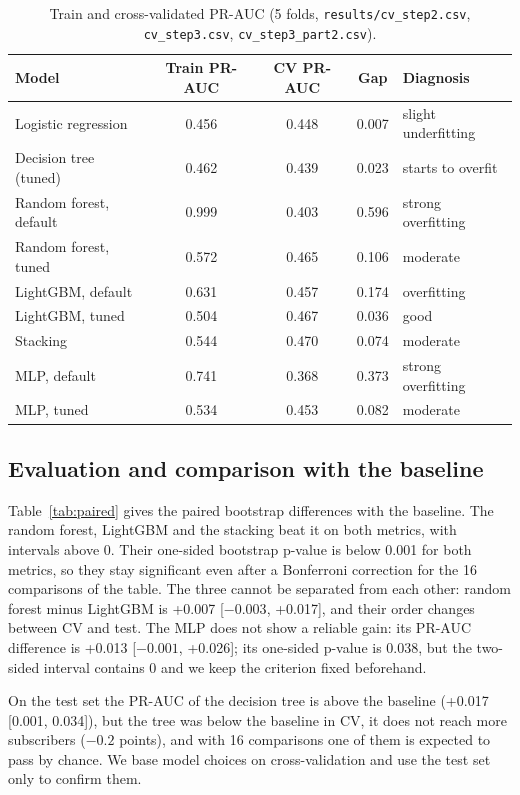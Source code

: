 \documentclass[11pt,a4paper]{article}
\begin{document}
\begin{table}[H]
\centering\small
\begin{tabular}{l c c c l}
\toprule
Model & Train PR-AUC & CV PR-AUC & Gap & Diagnosis \\
\midrule
Logistic regression & 0.456 & 0.448 & 0.007 & slight underfitting \\
Decision tree (tuned) & 0.462 & 0.439 & 0.023 & starts to overfit \\
Random forest, default & 0.999 & 0.403 & 0.596 & strong overfitting \\
Random forest, tuned & 0.572 & 0.465 & 0.106 & moderate \\
LightGBM, default & 0.631 & 0.457 & 0.174 & overfitting \\
LightGBM, tuned & 0.504 & 0.467 & 0.036 & good \\
Stacking & 0.544 & 0.470 & 0.074 & moderate \\
MLP, default & 0.741 & 0.368 & 0.373 & strong overfitting \\
MLP, tuned & 0.534 & 0.453 & 0.082 & moderate \\
\bottomrule
\end{tabular}
\caption{Train and cross-validated PR-AUC (5 folds, \texttt{results/cv\_step2.csv}, \texttt{cv\_step3.csv},
\texttt{cv\_step3\_part2.csv}).}
\label{tab:gaps}
\end{table}

\subsection{Evaluation and comparison with the baseline}
Table~\ref{tab:paired} gives the paired bootstrap differences with the baseline. The random forest, LightGBM and the
stacking beat it on both metrics, with intervals above 0. Their one-sided bootstrap p-value is below 0.001 for both
metrics, so they stay significant even after a Bonferroni correction for the 16 comparisons of the table. The three
cannot be separated from each other: random forest minus LightGBM is +0.007 [$-0.003$, +0.017], and their order
changes between CV and test. The MLP does not show a reliable gain: its PR-AUC difference is +0.013 [$-0.001$,
+0.026]; its one-sided p-value is 0.038, but the two-sided interval contains 0 and we keep the criterion fixed
beforehand.

On the test set the PR-AUC of the decision tree is above the baseline (+0.017 [0.001, 0.034]), but the tree was
below the baseline in CV, it does not reach more subscribers ($-0.2$ points), and with 16 comparisons one of them is
expected to pass by chance. We base model choices on cross-validation and use the test set only to confirm them.
\end{document}

